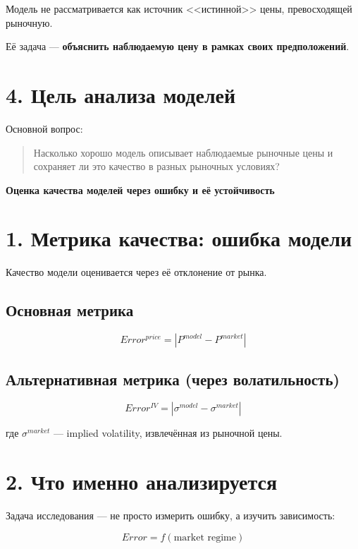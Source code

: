 \documentclass[12pt]{article}
\begin{document}
Модель не рассматривается как источник <<истинной>> цены, превосходящей рыночную.

Её задача --- \textbf{объяснить наблюдаемую цену в рамках своих предположений}.

\section*{4. Цель анализа моделей}

Основной вопрос:

\begin{quote}
Насколько хорошо модель описывает наблюдаемые рыночные цены и сохраняет ли это качество в разных рыночных условиях?
\end{quote}

\bigskip

\begin{center}
    {\LARGE \textbf{Оценка качества моделей через ошибку и её устойчивость}}
\end{center}

\section*{1. Метрика качества: ошибка модели}

Качество модели оценивается через её отклонение от рынка.

\subsection*{Основная метрика}

\[
Error^{price} = |P^{model} - P^{market}|
\]

\subsection*{Альтернативная метрика (через волатильность)}

\[
Error^{IV} = |\sigma^{model} - \sigma^{market}|
\]

где \(\sigma^{market}\) --- implied volatility, извлечённая из рыночной цены.

\section*{2. Что именно анализируется}

Задача исследования --- не просто измерить ошибку, а изучить зависимость:

\[
Error = f(\text{market regime})
\]
\end{document}
